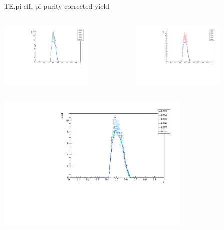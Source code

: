 \begin{frame}{TE,pi eff, pi purity corrected yield}
\begin{columns}
\begin{column}[T]{0.5\textwidth}
\includegraphics[width = 0.7\textwidth]{results/yield/check/yieldcheck_180_neg.pdf}
\end{column}
\begin{column}[T]{0.5\textwidth}
\includegraphics[width = 0.7\textwidth]{results/yield/check/yieldcheck_180_pos.pdf}
\end{column}
\end{columns}
\begin{columns}
\begin{column}[T]{0.5\textwidth}
\includegraphics[width = 0.7\textwidth]{results/yield/check/yieldcheck_170_neg.pdf}

\end{column}
\end{columns}
\end{frame}
